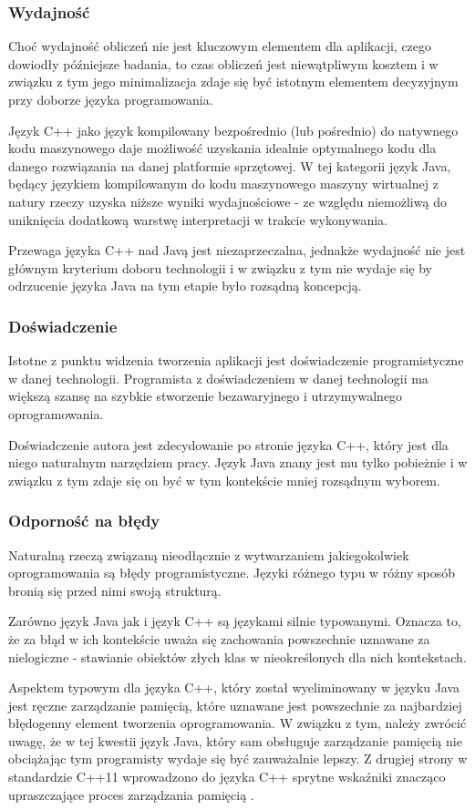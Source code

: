 {\subsubsection{Wydajność}
\par{
Choć wydajność obliczeń nie jest kluczowym elementem dla aplikacji, czego dowiodły późniejsze badania, to czas obliczeń jest niewątpliwym kosztem i w związku z tym jego minimalizacja zdaje się być istotnym elementem decyzyjnym przy doborze języka programowania.
}
\par{
Język C++ jako język kompilowany bezpośrednio (lub pośrednio) do natywnego kodu maszynowego daje możliwość uzyskania idealnie optymalnego kodu dla danego rozwiązania na danej platformie sprzętowej. W tej kategorii język Java, będący językiem kompilowanym do kodu maszynowego maszyny wirtualnej z natury rzeczy uzyska niższe wyniki wydajnościowe - ze względu niemożliwą do uniknięcia dodatkową warstwę interpretacji w trakcie wykonywania.
}
\par{
Przewaga języka C++ nad Javą jest niezaprzeczalna, jednakże wydajność nie jest głównym kryterium doboru technologii i w związku z tym nie wydaje się by odrzucenie języka Java na tym etapie było rozsądną koncepcją.
}
\subsubsection{Doświadczenie}
\par{
Istotne z punktu widzenia tworzenia aplikacji jest doświadczenie programistyczne w danej technologii. Programista z doświadczeniem w danej technologii ma większą szansę na szybkie stworzenie bezawaryjnego i utrzymywalnego oprogramowania.
}
\par{
Doświadczenie autora jest zdecydowanie po stronie języka C++, który jest dla niego naturalnym narzędziem pracy. Język Java znany jest mu tylko pobieżnie i w związku z tym zdaje się on być w tym kontekście mniej rozsądnym wyborem.
}
\subsubsection{Odporność na błędy}
\par{
Naturalną rzeczą związaną nieodłącznie z wytwarzaniem jakiegokolwiek oprogramowania są błędy programistyczne. Języki różnego typu w różny sposób bronią się przed nimi swoją strukturą.
}
\par{
Zarówno język Java jak i język C++ są językami silnie typowanymi. Oznacza to, że za błąd w ich kontekście uważa się zachowania powszechnie uznawane za nielogiczne - stawianie obiektów złych klas w nieokreślonych dla nich kontekstach.
}
\par{
Aspektem typowym dla języka C++, który został wyeliminowany w języku Java jest ręczne zarządzanie pamięcią, które uznawane jest powszechnie za najbardziej błędogenny element tworzenia oprogramowania. W związku z tym, należy zwrócić uwagę, że w tej kwestii język Java, który sam obsługuje zarządzanie pamięcią \cite{Java} nie obciążając tym programisty wydaje się być zauważalnie lepszy. Z drugiej strony w standardzie C++11 wprowadzono do języka C++ sprytne wskaźniki znacząco upraszczające proces zarządzania pamięcią \cite{isoCPP}.
}
}
